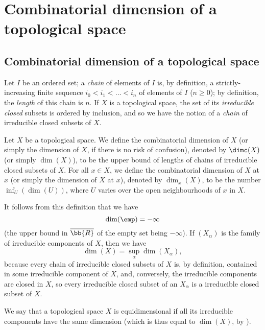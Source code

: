 \section{Combinatorial dimension of a topological space}
\label{section:combinatorial-dimension-of-a-topological-space}

\subsection{Combinatorial dimension of a topological space}
\label{subsection:combinatorial-dimension-of-a-topological-space}

\begin{env}[14.1.1]
\label{0.14.1.1}
Let $I$ be an ordered set; a \emph{chain} of elements of $I$ is, by definition, a strictly-increasing finite sequence $i_0<i_1<\ldots<i_n$ of elements of $I$ ($n\geq 0$); by definition, the \emph{length} of this chain is $n$.
If $X$ is a topological space, the set of its \emph{irreducible closed} subsets is ordered by inclusion, and so we have the notion of a \emph{chain} of irreducible closed subsets of $X$.
\end{env}

\begin{defn}[14.1.2]
\label{0.14.1.2}
Let $X$ be a topological space.
We define the combinatorial dimension of $X$ (or simply the dimension of $X$, if there is no risk of confusion), denoted by $\dimc(X)$ (or simply $\dim(X)$), to be the upper bound of lengths of chains of irreducible closed subsets of $X$.
For all $x\in X$, we define the combinatorial dimension of $X$ at $x$ (or simply the dimension of $X$ at $x$), denoted by $\dim_x(X)$, to be the number $\inf_U(\dim(U))$, where $U$ varies over the open neighbourhoods of $x$ in $X$.
\end{defn}

It follows from this definition that we have
\[
  \dim(\emp)=-\infty
\]
(the upper bound in $\overline{\bb{R}}$ of the empty set being $-\infty$).
If $(X_\alpha)$ is the family of irreducible components of $X$, then we have
\[
\label{0.14.1.2.1}
  \dim(X)=\sup_\alpha\dim(X_\alpha),
  \tag{14.1.2.1}
\]
because every chain of irreducible closed subsets of $X$ is, by definition, contained in some irreducible component of $X$, and, conversely, the irreducible components are closed in $X$, so every irreducible closed subset of an $X_\alpha$ is a irreducible closed subset of $X$.

\begin{defn}[14.1.3]
\label{0.14.1.3}
We say that a topological space $X$ is equidimensional if all its irreducible components have the same dimension (which is thus equal to $\dim(X)$, by ).
\end{defn}

